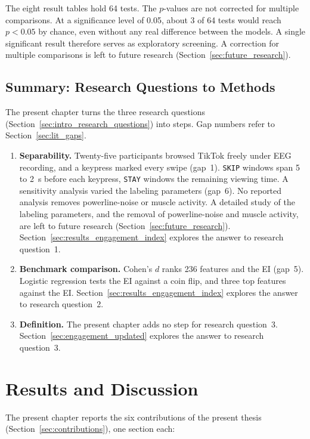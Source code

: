 \documentclass[12pt,a4paper]{report}
\begin{document}
The eight result tables hold 64 tests. The \(p\)-values are not corrected for multiple comparisons. At a significance level of 0.05, about 3 of 64 tests would reach \(p < 0.05\) by chance, even without any real difference between the models. A single significant result therefore serves as exploratory screening. A correction for multiple comparisons is left to future research (Section~\ref{sec:future_research}).

\section{Summary: Research Questions to Methods}
\label{sec:methods_conclusion}
The present chapter turns the three research questions (Section~\ref{sec:intro_research_questions}) into steps. Gap numbers refer to Section~\ref{sec:lit_gaps}.
\begin{enumerate}
    \item \textbf{Separability.} Twenty-five participants browsed TikTok freely under EEG recording, and a keypress marked every swipe (gap~1). \texttt{SKIP} windows span 5 to 2~s before each keypress, \texttt{STAY} windows the remaining viewing time. A sensitivity analysis varied the labeling parameters (gap~6). No reported analysis removes powerline-noise or muscle activity. A detailed study of the labeling parameters, and the removal of powerline-noise and muscle activity, are left to future research (Section~\ref{sec:future_research}). Section~\ref{sec:results_engagement_index} explores the answer to research question~1.
    \item \textbf{Benchmark comparison.} Cohen's \(d\) ranks 236 features and the EI (gap~5). Logistic regression tests the EI against a coin flip, and three top features against the EI. Section~\ref{sec:results_engagement_index} explores the answer to research question~2.
    \item \textbf{Definition.} The present chapter adds no step for research question~3. Section~\ref{sec:engagement_updated} explores the answer to research question~3.
\end{enumerate}


\chapter{Results and Discussion}
\label{chap:results}

The present chapter reports the six contributions of the present thesis (Section~\ref{sec:contributions}), one section each:
\end{document}
